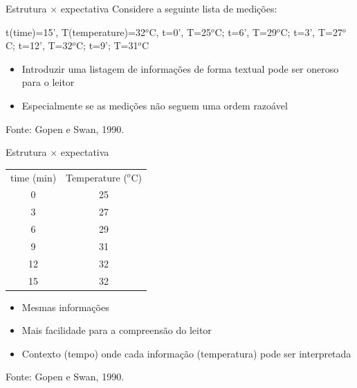\documentclass{beamer}
\begin{document}
\begin{frame}{Estrutura $\times$ expectativa}
  Considere a seguinte lista de medições:
  \begin{example}
    t(time)=15', T(temperature)=32$^o$C, t=0', T=25$^o$C; t=6',
    T=29$^o$C; t=3', T=27$^o$C; t=12', T=32$^o$C; t=9'; T=31$^o$C
  \end{example}

  \begin{itemize}
  \item Introduzir uma listagem de informações de forma textual pode
    ser oneroso para o leitor
  \item Especialmente se as medições não seguem uma ordem razoável
  \end{itemize}
\vfill
  Fonte: Gopen e Swan, 1990.
\end{frame}

\begin{frame}{Estrutura $\times$ expectativa}
  \begin{example}
    \begin{tabular}{cc}
      time (min) & Temperature ($^o$C) \\
      0 & 25 \\
      3 & 27 \\
      6 & 29 \\
      9 & 31 \\
      12 & 32 \\
      15 & 32 \\
    \end{tabular}
  \end{example}
  \begin{itemize}
  \item<1-> Mesmas informações
  \item Mais facilidade para a compreensão do leitor
  \item \alert{Contexto} (tempo) onde cada \alert{informação}
    (temperatura) pode ser interpretada
  \end{itemize}
\vfill
  Fonte: Gopen e Swan, 1990.
\end{frame}
\end{document}
